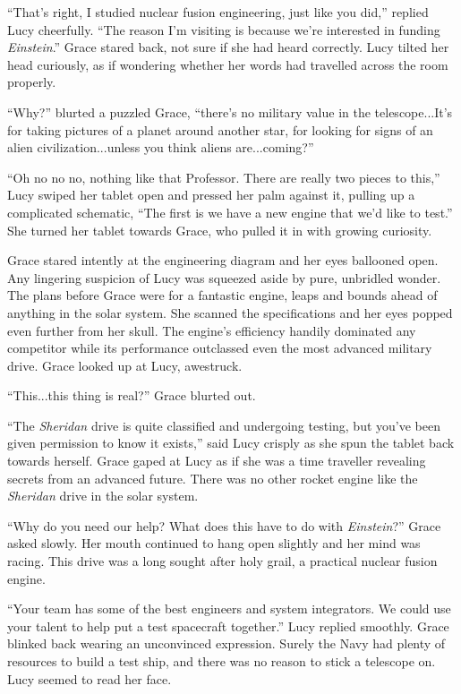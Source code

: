 \documentclass[12pt]{article} %
\begin{document}
``That's right, I studied nuclear fusion engineering, just like you did,'' replied Lucy cheerfully. ``The reason I'm visiting is because we're interested in funding \textit{Einstein}.'' Grace stared back, not sure if she had heard correctly. Lucy tilted her head curiously, as if wondering whether her words had travelled across the room properly.

``Why?'' blurted a puzzled Grace, ``there's no military value in the telescope...It's for taking pictures of a planet around another star, for looking for signs of an alien civilization...unless you think aliens are...coming?''

``Oh no no no, nothing like that Professor. There are really two pieces to this,'' Lucy swiped her tablet open and pressed her palm against it, pulling up a complicated schematic, ``The first is we have a new engine that we'd like to test.'' She turned her tablet towards Grace, who pulled it in with growing curiosity.

Grace stared intently at the engineering diagram and her eyes ballooned open. Any lingering suspicion of Lucy was squeezed aside by pure, unbridled wonder. The plans before Grace were for a fantastic engine, leaps and bounds ahead of anything in the solar system. She scanned the specifications and her eyes popped even further from her skull. The engine's efficiency handily dominated any competitor while its performance outclassed even the most advanced military drive. Grace looked up at Lucy, awestruck.

``This...this thing is real?'' Grace blurted out.

``The \textit{Sheridan} drive is quite classified and undergoing testing, but you've been given permission to know it exists,'' said Lucy crisply as she spun the tablet back towards herself. Grace gaped at Lucy as if she was a time traveller revealing secrets from an advanced future. There was no other rocket engine like the \textit{Sheridan} drive in the solar system.

``Why do you need our help? What does this have to do with \textit{Einstein}?'' Grace asked slowly. Her mouth continued to hang open slightly and her mind was racing. This drive was a long sought after holy grail, a practical nuclear fusion engine.

``Your team has some of the best engineers and system integrators. We could use your talent to help put a test spacecraft together.'' Lucy replied smoothly. Grace blinked back wearing an unconvinced expression. Surely the Navy had plenty of resources to build a test ship, and there was no reason to stick a telescope on. Lucy seemed to read her face.
\end{document}
